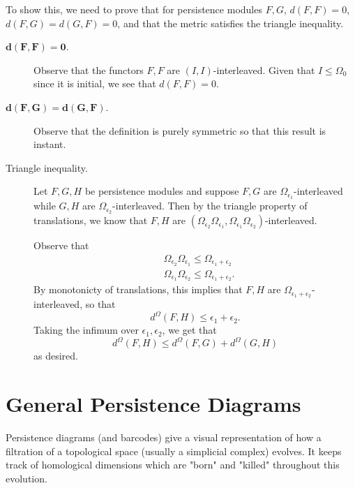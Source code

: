 \begin{prf}
    To show this, we need to prove that for persistence modules $F, G$, 
    $d(F, F) = 0$, $d(F, G) = d(G, F) = 0$, and that the metric satisfies the triangle 
    inequality. 
    \begin{description}
        \item[$\bm{d(F, F) = 0}$.]
        Observe that the functors  $F, F$ are $(I, I)$-interleaved. Given that $I \le \Omega_0$ 
        since it is initial, we see that $d(F,  F) = 0$. 

        \item[$\bm{d(F, G) = d(G, F)}$.] Observe that the definition is purely symmetric 
        so that this result is instant. 
        
        \item[Triangle inequality.]
        Let $F, G, H$ be persistence modules and suppose $F, G$ are $\Omega_{\epsilon_1}$-interleaved 
        while $G, H$ are $\Omega_{\epsilon_2}$-interleaved. Then by the triangle property of 
        translations, we know that $F, H$ are  $(\Omega_{\epsilon_2}\Omega_{\epsilon_1}, \Omega_{\epsilon_1}\Omega_{\epsilon_2})$-interleaved. 
        
        Observe that 
        \begin{align*}
            &\Omega_{\epsilon_2}\Omega_{\epsilon_1} \le \Omega_{\epsilon_1 + \epsilon_2}\\
            &\Omega_{\epsilon_1}\Omega_{\epsilon_2} \le \Omega_{\epsilon_1 + \epsilon_2}.
        \end{align*}
        By monotonicty of translations, this implies that $F, H$ are $\Omega_{\epsilon_1 + \epsilon_2}$-interleaved, 
        so that 
        \[
            d^{\Omega}(F, H) \le \epsilon_1 + \epsilon_2.
        \]
        Taking the infimum over $\epsilon_1, \epsilon_2$, we get that 
        \[
            d^{\Omega}(F, H) \le d^{\Omega}(F, G) + d^{\Omega}(G, H)
        \]
        as desired. 
    \end{description}
\end{prf}

\newpage
\section{General Persistence Diagrams}

Persistence diagrams (and barcodes) give a visual representation of 
how a filtration of a topological space (usually a simplicial complex)
evolves. It keeps track of homological dimensions which are "born" and "killed" 
throughout this evolution. 

